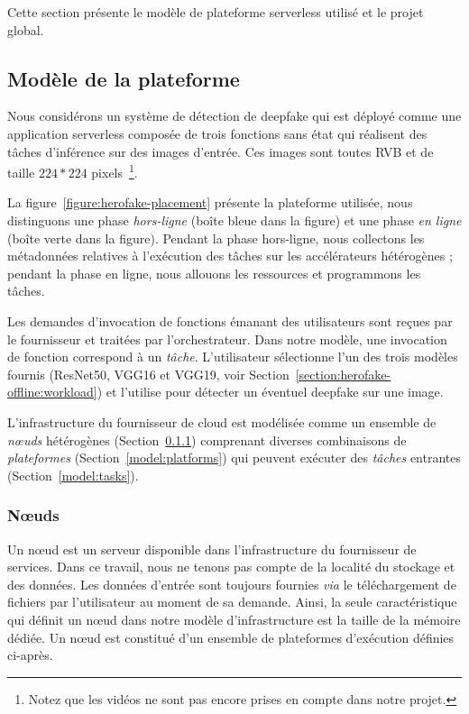 Cette section présente le modèle de plateforme serverless utilisé et le projet global.

\subsection{Modèle de la plateforme}

Nous considérons un système de détection de deepfake qui est déployé comme une application serverless composée de trois fonctions sans état qui réalisent des tâches d'inférence sur des images d'entrée. Ces images sont toutes RVB et de taille $224 * 224$ pixels~\footnote{Notez que les vidéos ne sont pas encore prises en compte dans notre projet.}.

La figure~\ref{figure:herofake-placement} présente la plateforme utilisée, nous distinguons une phase \textit{hors-ligne} (boîte bleue dans la figure) et une phase \textit{en ligne} (boîte verte dans la figure). Pendant la phase hors-ligne, nous collectons les métadonnées relatives à l'exécution des tâches sur les accélérateurs hétérogènes ; pendant la phase en ligne, nous allouons les ressources et programmons les tâches.

Les demandes d'invocation de fonctions émanant des utilisateurs sont reçues par le fournisseur et traitées par l'orchestrateur. Dans notre modèle, une invocation de fonction correspond à un \textit{tâche}. L'utilisateur sélectionne l'un des trois modèles fournis (ResNet50, VGG16 et VGG19, voir Section~\ref{section:herofake-offline:workload}) et l'utilise pour détecter un éventuel deepfake sur une image.

L'infrastructure du fournisseur de cloud est modélisée comme un ensemble de \textit{nœuds} hétérogènes (Section~\ref{model:nodes}) comprenant diverses combinaisons de \textit{plateformes} (Section~\ref{model:platforms}) qui peuvent exécuter des \textit{tâches} entrantes (Section~\ref{model:tasks}). 

\subsubsection{Nœuds}
\label{model:nodes}
Un nœud est un serveur disponible dans l'infrastructure du fournisseur de services. Dans ce travail, nous ne tenons pas compte de la localité du stockage et des données. Les données d'entrée sont toujours fournies \textit{via} le téléchargement de fichiers par l'utilisateur au moment de sa demande.
Ainsi, la seule caractéristique qui définit un nœud dans notre modèle d'infrastructure est la taille de la mémoire dédiée. Un nœud est constitué d'un ensemble de plateformes d'exécution définies ci-après.

